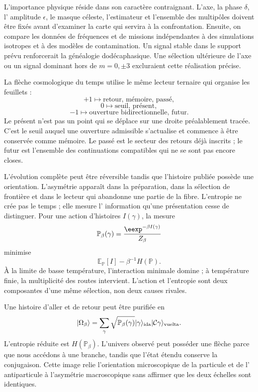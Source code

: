 L'importance physique réside dans son caractère contraignant. L'axe, la phase \(\delta\), l'
amplitude \(\epsilon\), le masque céleste, l'estimateur et l'ensemble des multipôles
doivent être fixés avant d'examiner la carte qui servira à la confrontation. Ensuite, on
compare les données de fréquences et de missions indépendantes à des simulations isotropes
et à des modèles de contamination. Un signal stable dans le support prévu renforcerait
la généalogie dodécaphasique. Une sélection ultérieure de l'axe ou un signal dominant
hors de \(m=0,\pm3\) excluraient cette réalisation précise.

La flèche cosmologique du temps utilise le même lecteur ternaire qui organise les
feuillets :
\[
 +1
 \longmapsto
 \text{retour, mémoire, passé},
\]
\[
 0
 \longmapsto
 \text{seuil, présent},
\]
\[
 -1
 \longmapsto
 \text{ouverture bidirectionnelle, futur}.
\]
Le présent n'est pas un point qui se déplace sur une droite préalablement tracée. C'est
le seuil auquel une ouverture admissible s'actualise et commence à être conservée comme
mémoire. Le passé est le secteur des retours déjà inscrits ; le futur est l'ensemble
des continuations compatibles qui ne se sont pas encore closes.

L'évolution complète peut être réversible tandis que l'histoire publiée possède une
orientation. L'asymétrie apparaît dans la préparation, dans la sélection de frontière et
dans le lecteur qui abandonne une partie de la fibre. L'entropie ne crée pas le temps ; elle mesure l'
information qu'une présentation cesse de distinguer. Pour une action d'histoires
\(I(\gamma)\), la mesure
\[
 \mathbb P_\beta(\gamma)
 =
 \frac{\eexp^{-\beta I(\gamma)}}{Z_\beta}
\]
minimise
\[
 \mathbb E_{\mathbb P}[I]
 -
 \beta^{-1}H(\mathbb P).
\]
À la limite de basse température, l'interaction minimale domine ; à température
finie, la multiplicité des routes intervient. L'action et l'entropie sont deux
composantes d'une même sélection, non deux causes rivales.

Une histoire d'aller et de retour peut être purifiée en
\[
 |\Omega_\beta\rangle
 =
 \sum_\gamma
 \sqrt{\mathbb P_\beta(\gamma)}
 |\gamma\rangle_{\rm ida}
 |\mathcal C\gamma\rangle_{\rm vuelta}.
\]
L'entropie réduite est \(H(\mathbb P_\beta)\). L'univers observé peut posséder
une flèche parce que nous accédons à une branche, tandis que l'état étendu conserve la
conjugaison. Cette image relie l'orientation microscopique de la particule et de l'
antiparticule à l'asymétrie macroscopique sans affirmer que les deux échelles sont
identiques.

